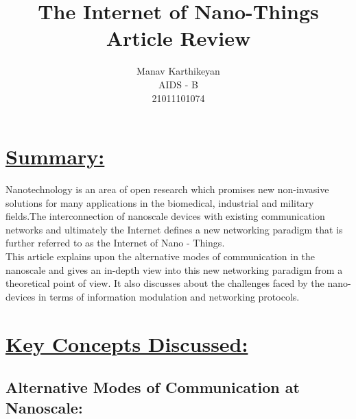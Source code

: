 \documentclass{report}
\title{\Huge\textbf{The Internet of Nano-Things}\\Article Review}
\author{Manav Karthikeyan\\AIDS - B\\21011101074}
\begin{document}
\maketitle
\begin{center}
    \section*{\huge{}}    
\end{center}
\vspace{10mm}
\section*{\uline{Summary:}}
\justifying

Nanotechnology is an area of open research which promises new non-invasive solutions for many applications in the biomedical, industrial and military fields.The interconnection of nanoscale devices with existing communication networks and ultimately the Internet defines a new networking paradigm that is further referred to as the Internet of Nano - Things.\\

This article explains upon the alternative modes of communication in the nanoscale and gives an in-depth view into this new networking paradigm from a theoretical point of view. It also discusses about the challenges faced by the nano-devices in terms of information modulation and networking protocols.

\section*{\uline{Key Concepts Discussed:}}

\subsection*{Alternative Modes of Communication at Nanoscale:}
\end{document}
